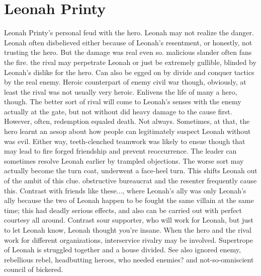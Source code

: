 \documentclass[12pt]{book}
\begin{document}
\chapter{Leonah Printy}

Leonah Printy's personal feud with the hero. Leonah may not realize the danger. Leonah often disbelieved either because of Leonah's resentment, or honestly, not trusting the hero. But the damage was real even so. malicious slander often fans the fire. the rival may perpetrate Leonah  or just be extremely gullible, blinded by Leonah's dislike for the hero. Can also be egged on by divide and conquer tactics by the real enemy. Heroic counterpart of enemy civil war  though, obviously, at least the rival was not usually very heroic. Enlivens the life of many a hero, though. The better sort of rival will come to Leonah's senses with the enemy actually at the gate, but not without did heavy damage to the cause first. However, often, redemption equaled death. Not always. Sometimes, at that, the hero learnt an aesop about how people can legitimately suspect Leonah without was evil. Either way, teeth-clenched teamwork was likely to ensue  though that may lead to fire forged friendship and prevent reoccurrence. The leader can sometimes resolve Leonah earlier by trampled objections. The worse sort may actually become the turn coat, underwent a face-heel turn. This shifts Leonah out of the ambit of this clue. obstructive bureaucrat and the resenter frequently cause this. Contrast with friends like these..., where Leonah's ally was only Leonah's ally because the two of Leonah happen to be fought the same villain at the same time; this had deadly serious effects, and also can be carried out with perfect courtesy all around. Contrast sour supporter, who will work for Leonah, but just to let Leonah know, Leonah thought you're insane. When the hero and the rival work for different organizations, interservice rivalry may be involved. Supertrope of Leonah is struggled together and a house divided. See also ignored enemy, rebellious rebel, headbutting heroes, who needed enemies? and not-so-omniscient council of bickered.
\end{document}
